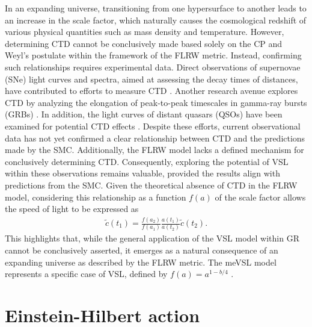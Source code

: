 \documentclass[jkps,preprint,fleqn]{revtex4} %
\newcommand{\tc}{\tilde{c}}
\begin{document}
 In an expanding universe, transitioning from one hypersurface to another leads to an increase in the scale factor, which naturally causes the cosmological redshift of various physical quantities such as mass density and temperature. However, determining CTD cannot be conclusively made based solely on the CP and Weyl’s postulate within the framework of the FLRW metric. Instead, confirming such relationships requires experimental data. Direct observations of supernovae (SNe) light curves and spectra, aimed at assessing the decay times of distances, have contributed to efforts to measure CTD \cite{Leibundgut:1996qm,SupernovaSearchTeam:1997gem,Foley:2005qu,Blondin:2007ua,Blondin:2008mz,Lee:2023ucu,DES:2024vgg,Lee:2024kxa}. Another research avenue explores CTD by analyzing the elongation of peak-to-peak timescales in gamma-ray bursts (GRBs) \cite{Norris:1993hda,Wijers:1994qf,Band:1994ee,Meszaros:1995gj,Lee:1996zu,Chang:2001fy,Crawford:2009be,Zhang:2013yna,Singh:2021jgr}.  In addition, the light curves of distant quasars (QSOs) have been examined for potential CTD effects \cite{Hawkins:2001be,Dai:2012wp,Lewis:2023jab}. Despite these efforts, current observational data has not yet confirmed a clear relationship between CTD and the predictions made by the SMC. Additionally, the FLRW model lacks a defined mechanism for conclusively determining CTD. Consequently, exploring the potential of VSL within these observations remains valuable, provided the results align with predictions from the SMC.
Given the theoretical absence of CTD in the FLRW model, considering this relationship as a function $f(a)$ of the scale factor allows the speed of light to be expressed as 
\begin{align} \tc(t_1) = \frac{f(a_2)}{f(a_1)} \frac{a(t_1)}{a(t_2)} \tc(t_2) \label{cVSL}. \end{align} 
This highlights that, while the general application of the VSL model within GR cannot be conclusively asserted, it emerges as a natural consequence of an expanding universe as described by the FLRW metric. The meVSL model represents a specific case of VSL, defined by $f(a) = a^{1-b/4}$ \cite{Lee:2020zts,Lee:2023bjz}.

\section{Einstein-Hilbert action}\label{sec:HEaction}
\end{document}
